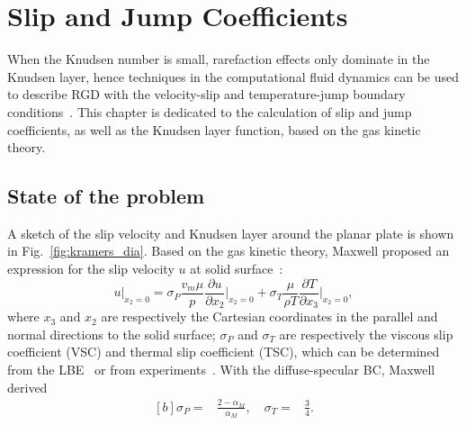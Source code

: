 \chapter{Slip and Jump Coefficients}
\label{chap:velocity_slip}


When the Knudsen number is small, rarefaction effects only dominate in the Knudsen layer, hence techniques in the computational fluid dynamics can be used to describe RGD with the velocity-slip and temperature-jump boundary conditions~\citep{sharipov1998data,lockerby2004velocity,leontidis2014numerical}. This chapter is dedicated to the calculation of slip and jump coefficients, as well as the Knudsen layer function, based on the gas kinetic theory.


\section{State of the problem}

A sketch of the slip velocity and Knudsen layer around the planar plate is shown in Fig.~\ref{fig:kramers_dia}. Based on the gas kinetic theory, Maxwell proposed an expression for the slip velocity $u$ at solid surface~\cite{Maxwell1879vii}: 
\begin{equation}\label{eq:slipBC}
u\big|_{x_2=0}=\sigma_P \frac{v_m\mu}{p} \frac{\partial u}{\partial {x_2}}  \bigg|_{x_2=0}+  \sigma_T \frac{\mu}{\rho T} \frac{\partial{T}}{\partial x_3}  \bigg|_{x_2=0},
\end{equation}
where $x_3$ and $x_2$ are respectively the Cartesian coordinates in the parallel
and normal directions to the solid surface; $\sigma_P$ and $\sigma_T$ are respectively the viscous slip coefficient (VSC) and thermal slip coefficient (TSC), which can be determined from the LBE~\citep{ohwada1989numerical,siewert2003viscous,SU2019573} or from experiments~\citep{annis1972thermal,porodnov1978thermal,rojas2015new,Yamaguchi2016JFM}. With the diffuse-specular BC, Maxwell derived
\begin{equation}\label{rough_bc}
\begin{aligned}[b]
\sigma_P=&\frac{2-\alpha_M}{\alpha_M}, \quad
\sigma_T=&\frac{3}{4}.
\end{aligned}
\end{equation}


